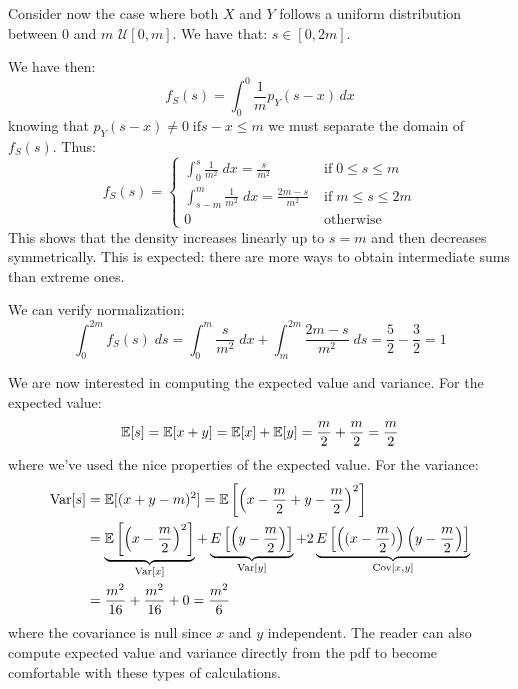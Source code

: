 \begin{exercise}
	Consider now the case where both $X$ and $Y$ follows a uniform distribution between $0$ and $m$ $\mathcal{U}[0,m]$. We have that: $s \in [0, 2m]$.
	
	We have then:
	\[
	f_S(s)
	=
	\int_{0}^{0}
	\frac{1}{m}p_Y(s-x)\,dx
	\]
	knowing that $p_Y(s-x)\neq0 \; \text{if} s-x\leq m$ we must separate the domain of $f_S(s)$. Thus:
	\[
		f_S(s)=\begin{cases}
		\int_0^s\frac{1}{m^2}\;dx=\frac{s}{m^2} \; &\text{if} \; 0\leq s\leq m\\
		\int_{s-m}^m\frac{1}{m^2}\;dx=\frac{2m-s}{m^2} \; &\text{if} \; m\leq s\leq 2m\\
		0 \; &\text{otherwise}
		\end{cases}
	\]
	This shows that the density increases linearly up to $s=m$ and then decreases symmetrically. This is expected: there are more ways to obtain intermediate sums than extreme ones.
	
	We can verify normalization:
	\[
		\int_{0}^{2m}f_S(s)\;ds=\int_0^m\frac{s}{m^2}\;dx+\int_m^{2m}\frac{2m-s}{m^2}\;ds=\frac{5}{2}-\frac{3}{2}=1
	\]
	
	We are now interested in computing the expected value and variance. For the expected value:
	\[
		\mathbb{E}[s]=\mathbb{E}[x+y]=\mathbb{E}[x]+\mathbb{E}[y]=\frac{m}{2}+\frac{m}{2}=\frac{m}{2}
	\]
	where we've used the nice properties of the expected value. For the variance:
	\begin{align*}
		\operatorname{Var}[s]&=\mathbb{E}[(x+y-m)^2]=\mathbb{E}\left[\left(x-\frac{m}{2}+y-\frac{m}{2}\right)^2\right]\\
		&=\underbrace{\mathbb{E}\left[\left(x-\frac{m}{2}\right)^2\right]}_{\operatorname{Var}[x]}+\underbrace{E\left[\left(y-\frac{m}{2}\right)\right]}_{\operatorname{Var}[y]}+2\underbrace{E\left[\left((x-\frac{m}{2})\right)\left(y-\frac{m}{2}\right)\right]}_{\operatorname{Cov}[x,y]}\\
		&=\frac{m^2}{16}+\frac{m^2}{16}+0=\frac{m^2}{6}
	\end{align*}
	where the covariance is null since $x$ and $y$ independent. The reader can also compute expected value and variance directly from the pdf to become comfortable with these types of calculations.
\end{exercise}

